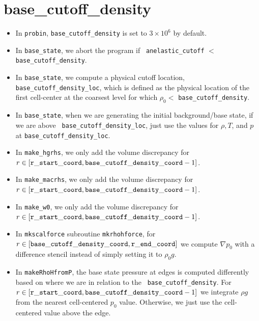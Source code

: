 \section{base\_cutoff\_density}

\begin{itemize}

\item In {\tt probin}, {\tt base\_cutoff\_density} is set to $3\times 10^6$
  by default.

\item In {\tt base\_state}, we abort the program if {\tt
  anelastic\_cutoff} $<$ {\tt base\_cutoff\_density}.

\item In {\tt base\_state}, we compute a physical cutoff location,
  {\tt base\_cutoff\_density\_loc}, which is defined as the physical
  location of the first cell-center at the coarsest level for which
  $\rho_0 <$ {\tt base\_cutoff\_density}.

\item In {\tt base\_state}, when we are generating the initial
  background/base state, if we are above {\tt
    base\_cutoff\_density\_loc}, just use the values for $\rho,T$, and
  $p$ at {\tt base\_cutoff\_density\_loc}.

\item In {\tt make\_hgrhs}, we only add the volume discrepancy for
  $r\in[{\tt r\_start\_coord},{\tt base\_cutoff\_density\_coord}-1]$.

\item In {\tt make\_macrhs}, we only add the volume discrepancy for
  $r\in[{\tt r\_start\_coord},{\tt base\_cutoff\_density\_coord}-1]$.

\item In {\tt make\_w0}, we only add the volume discrepancy for
  $r\in[{\tt r\_start\_coord},{\tt base\_cutoff\_density\_coord}-1]$.

\item In {\tt mkscalforce} subroutine {\tt mkrhohforce}, for
  $r\in[{\tt base\_cutoff\_density\_coord},{\tt r\_end\_coord}]$ we
  compute $\nabla p_0$ with a difference stencil instead of simply
  setting it to $\rho_0 g$.

\item In {\tt makeRhoHfromP}, the base state pressure at edges is
  computed differently based on where we are in relation to the {\tt
    base\_cutoff\_density}.  For $r\in[{\tt r\_start\_coord},{\tt
      base\_cutoff\_density\_coord}-1]$ we integrate $\rho g$ from the
  nearest cell-centered $p_0$ value.  Otherwise, we just use the
  cell-centered value above the edge.


\end{itemize}
